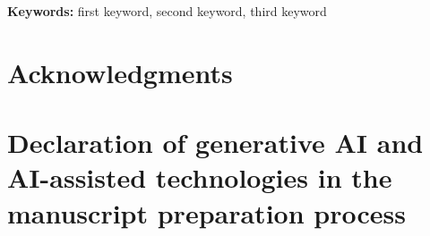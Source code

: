 \documentclass[11pt,a4paper]{article}
\title{\PaperTitle}
\author{\PaperAuthor\\[0.5ex]
  {\normalsize Institute of Computer Science, Faculty of Science}\\
  {\normalsize Pavol Jozef Šafárik University in Košice, Košice, Slovakia}\\
  {\normalsize\texttt{5344553@upjs.sk}}}
\date{\today}
\begin{document}
\maketitle

\begin{abstract}

\end{abstract}

\noindent\textbf{Keywords:} first keyword, second keyword, third keyword






\section*{Acknowledgments}


\section*{Declaration of generative AI and AI-assisted technologies in the manuscript preparation process}




\end{document}
